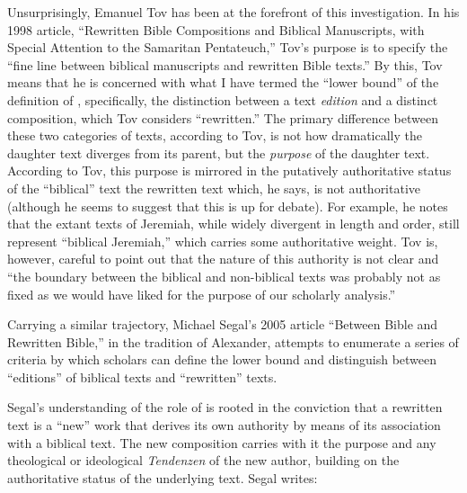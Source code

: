 Unsurprisingly, Emanuel Tov has been at the forefront of this investigation. In his 1998 article, ``Rewritten Bible Compositions and Biblical Manuscripts, with Special Attention to the Samaritan Pentateuch,'' Tov's purpose is to specify the ``fine line between biblical manuscripts and rewritten Bible texts.''%
    \autocite[334]{tov_dsd1998}
By this, Tov means that he is concerned with what I have termed the ``lower bound'' of the definition of \rwb, specifically, the distinction between a text \emph{edition} and a distinct composition, which Tov considers ``rewritten.'' The primary difference between these two categories of texts, according to Tov, is not how dramatically the daughter text diverges from its parent, but the \emph{purpose} of the daughter text.%
    \autocite[334]{tov_dsd1998}
According to Tov, this purpose is mirrored in the putatively authoritative status of the ``biblical'' text \visavis the rewritten text which, he says, is not authoritative (although he seems to suggest that this is up for debate).%
    \autocite[337]{tov_dsd1998}
For example, he notes that the extant texts of Jeremiah, while widely divergent in length and order, still represent ``biblical Jeremiah,'' which carries some authoritative weight. Tov is, however, careful to point out that the nature of this authority is not clear and ``the boundary between the biblical and non-biblical texts was probably not as fixed as we would have liked for the purpose of our scholarly analysis.''%
    \autocite[335]{tov_dsd1998} 

Carrying a similar trajectory, Michael Segal's 2005 article ``Between Bible and Rewritten Bible,'' in the tradition of Alexander, attempts to enumerate a series of criteria by which scholars can define the lower bound and distinguish between ``editions'' of biblical texts and ``rewritten'' texts. 

Segal's understanding of the role of \rwb is rooted in the conviction that a rewritten text is a ``new'' work that derives its own authority by means of its association with a biblical text. The new composition carries with it the purpose and any theological or ideological \emph{Tendenzen} of the new author, building on the authoritative status of the underlying text.%
    \autocite[11]{segal_henze2005} Segal writes: 

